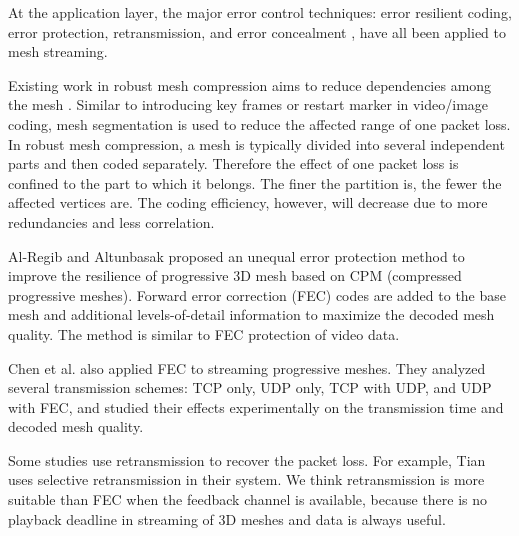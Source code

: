 \documentclass[11pt, a4paper]{report}
\begin{document}
    At the application layer, the major error control techniques: error
    resilient coding, error protection, retransmission, and error
    concealment \cite{Park2003}, have all been applied to mesh streaming.  
    
    Existing work in robust mesh compression aims to
    reduce dependencies among the mesh \cite{error:Park,error:Yan}.
    Similar to introducing key frames or restart marker in video/image
    coding, mesh segmentation is used to reduce the affected range of one
    packet loss. In robust mesh compression, a mesh is typically
    divided into several independent parts and then coded separately.
    Therefore the effect of one packet loss is confined to the part to which
    it belongs. The finer the partition is, the fewer the affected vertices
    are.  The coding efficiency, however, will decrease
    due to more redundancies and less correlation.

    Al-Regib and Altunbasak \cite{unequal:Al-Regib} proposed an
    unequal error protection method to improve the resilience of
    progressive 3D mesh based on CPM (compressed progressive meshes). 
    Forward error correction (FEC) codes are added to the
    base mesh and additional levels-of-detail information to maximize 
    the decoded mesh quality.  The method is similar to FEC protection 
    of video data.

    Chen et al. \cite{chen05hybrid} also applied FEC to streaming
    progressive meshes. They analyzed several transmission schemes:
    TCP only, UDP only, TCP with UDP, and UDP with FEC, and studied
    their effects experimentally on the transmission time and decoded
    mesh quality.
    
    Some studies use retransmission to recover the packet loss.
    For example, Tian \cite{Tian2006} uses selective retransmission in their system.
    We think retransmission is more suitable than FEC when the feedback
    channel is available, because there is no playback deadline in streaming
    of 3D meshes and data is always useful.
\end{document}
